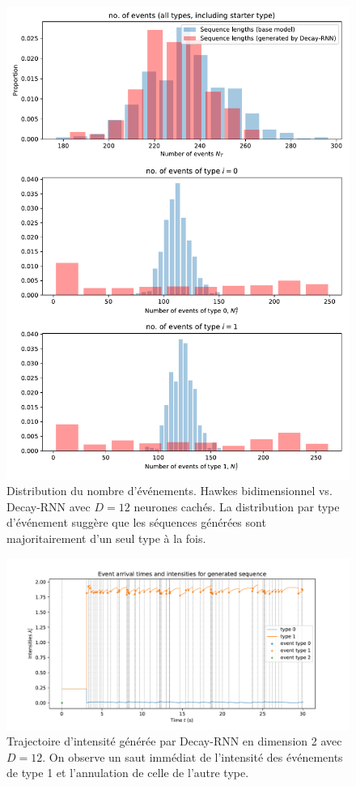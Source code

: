 \documentclass[../main.tex]{subfiles}
\begin{document}
\begin{figure}[htp]
	\includegraphics[width=\linewidth]{../results/seq_length_distrib_Decay-RNN-2d-hidden_12-20181201-003410.pdf}
	\caption{Distribution du nombre d'événements. Hawkes bidimensionnel vs. Decay-RNN avec $D=12$ neurones cachés. La distribution par type d'événement suggère que les séquences générées sont majoritairement d'un seul type à la fois.}\label{fig:hawkes2DDecayRNNlengthDistrib}
\end{figure}

\begin{figure}[htp]
	\includegraphics[width=\linewidth]{../results/intensity_Decay-RNN_2d_hidden12_20181201-003410.pdf}
	\caption{Trajectoire d'intensité générée par Decay-RNN en dimension 2 avec $D=12$. On observe un saut immédiat de l'intensité des événements de type 1 et l'annulation de celle de l'autre type.}\label{fig:hawkes2DDecayRNNintensityPlot}
\end{figure}
\end{document}
